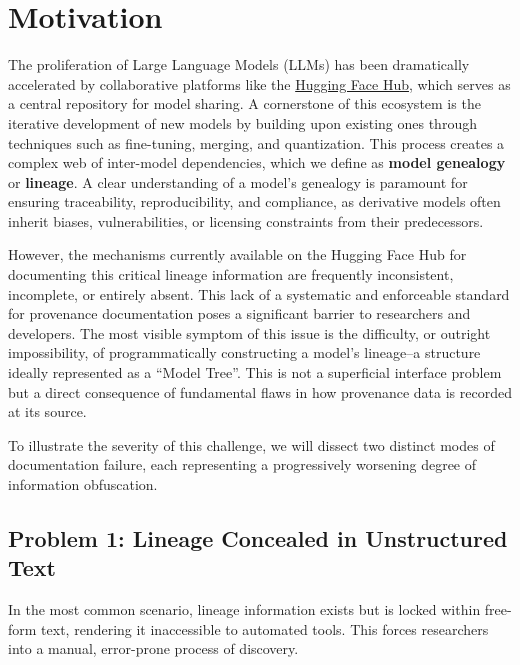 \section{Motivation}

The proliferation of Large Language Models (LLMs) has been dramatically accelerated by collaborative platforms like the \href{https://huggingface.co/}{Hugging Face Hub}, which serves as a central repository for model sharing. A cornerstone of this ecosystem is the iterative development of new models by building upon existing ones through techniques such as fine-tuning, merging, and quantization. This process creates a complex web of inter-model dependencies, which we define as \textbf{model genealogy} or \textbf{lineage}. A clear understanding of a model's genealogy is paramount for ensuring traceability, reproducibility, and compliance, as derivative models often inherit biases, vulnerabilities, or licensing constraints from their predecessors.

However, the mechanisms currently available on the Hugging Face Hub for documenting this critical lineage information are frequently inconsistent, incomplete, or entirely absent. This lack of a systematic and enforceable standard for provenance documentation poses a significant barrier to researchers and developers. The most visible symptom of this issue is the difficulty, or outright impossibility, of programmatically constructing a model's lineage--a structure ideally represented as a ``Model Tree''. This is not a superficial interface problem but a direct consequence of fundamental flaws in how provenance data is recorded at its source.

To illustrate the severity of this challenge, we will dissect two distinct modes of documentation failure, each representing a progressively worsening degree of information obfuscation.

\subsection{Problem 1: Lineage Concealed in Unstructured Text}
In the most common scenario, lineage information exists but is locked within free-form text, rendering it inaccessible to automated tools. This forces researchers into a manual, error-prone process of discovery.

